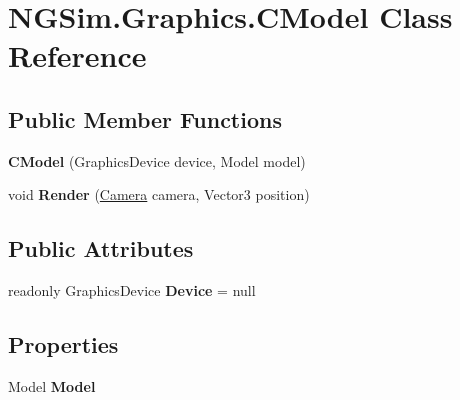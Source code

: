 \hypertarget{class_n_g_sim_1_1_graphics_1_1_c_model}{}\section{N\+G\+Sim.\+Graphics.\+C\+Model Class Reference}
\label{class_n_g_sim_1_1_graphics_1_1_c_model}
\subsection*{Public Member Functions}
\begin{DoxyCompactItemize}
\item 
\mbox{\label{class_n_g_sim_1_1_graphics_1_1_c_model_a650d6c0113db431e5e82118571e90bef}} 
{\bfseries C\+Model} (Graphics\+Device device, Model model)
\item 
\mbox{\label{class_n_g_sim_1_1_graphics_1_1_c_model_ad7a42b30fc247e76fa1db5f63163195a}} 
void {\bfseries Render} (\hyperlink{class_n_g_sim_1_1_graphics_1_1_camera}{Camera} camera, Vector3 position)
\end{DoxyCompactItemize}
\subsection*{Public Attributes}
\begin{DoxyCompactItemize}
\item 
\mbox{\label{class_n_g_sim_1_1_graphics_1_1_c_model_aa0f0dfabda48854ef2ac2a17bcd1281e}} 
readonly Graphics\+Device {\bfseries Device} = null
\end{DoxyCompactItemize}
\subsection*{Properties}
\begin{DoxyCompactItemize}
\item 
\mbox{\label{class_n_g_sim_1_1_graphics_1_1_c_model_a8ed0e2324aee3e53d58821f576ca0458}} 
Model {\bfseries Model}
\end{DoxyCompactItemize}
